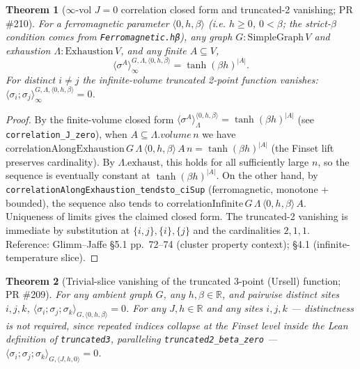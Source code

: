 \documentclass[a4paper,11pt]{article}
\newtheorem{theorem}{Theorem}
\begin{document}
\begin{theorem}[$\infty$-vol $J = 0$ correlation closed form and
truncated-2 vanishing; PR \#210]
For a ferromagnetic parameter $\langle 0, h, \beta \rangle$
(i.e. $h \ge 0$, $0 < \beta$; the strict-$\beta$ condition comes
from \texttt{Ferromagnetic.hβ}), any graph $G :
\mathrm{SimpleGraph}\, V$ and exhaustion $\Lambda :
\mathrm{Exhaustion}\, V$, and any finite $A \subseteq V$,
\[
  \langle \sigma^A \rangle_\infty^{G,\Lambda,\langle 0,h,\beta\rangle}
  = \tanh(\beta h)^{|A|}.
\]
For distinct $i \neq j$ the infinite-volume truncated 2-point
function vanishes:
$\langle \sigma_i; \sigma_j \rangle_\infty^{G,\Lambda,\langle 0,h,\beta\rangle}
= 0$.
\end{theorem}

\begin{proof}
By the finite-volume closed form $\langle \sigma^A
\rangle_\Lambda^{\langle 0,h,\beta\rangle} = \tanh(\beta h)^{|A|}$
(see \texttt{correlation\_J\_zero}), when $A \subseteq \Lambda.volume\,n$
we have
$\text{correlationAlongExhaustion}\,G\,\Lambda\,\langle 0,h,\beta\rangle\,A\,n
= \tanh(\beta h)^{|A|}$
(the Finset lift preserves cardinality). By $\Lambda.\mathrm{exhaust}$,
this holds for all sufficiently large $n$, so the sequence is
eventually constant at $\tanh(\beta h)^{|A|}$. On the other hand,
by \texttt{correlationAlongExhaustion\_tendsto\_ciSup}
(ferromagnetic, monotone + bounded), the sequence also tends to
$\mathrm{correlationInfinite}\,G\,\Lambda\,\langle 0,h,\beta\rangle\,A$.
Uniqueness of limits gives the claimed closed form.
The truncated-2 vanishing is immediate by substitution at
$\{i,j\}, \{i\}, \{j\}$ and the cardinalities $2, 1, 1$.
Reference: Glimm--Jaffe \cite{glimm-jaffe} \S 5.1 pp.~72--74
(cluster property context); \S 4.1 (infinite-temperature slice).
\end{proof}

\begin{theorem}[Trivial-slice vanishing of the truncated 3-point
(Ursell) function; PR \#209]
For any ambient graph $G$, any $h, \beta \in \mathbb{R}$, and
pairwise distinct sites $i, j, k$,
$\langle \sigma_i; \sigma_j; \sigma_k
\rangle_{G,\langle 0,h,\beta\rangle} = 0$.
For any $J, h \in \mathbb{R}$ and any sites $i, j, k$ — distinctness
is not required, since repeated indices collapse at the Finset
level inside the Lean definition of \texttt{truncated3}, paralleling
\texttt{truncated2\_beta\_zero} —
$\langle \sigma_i; \sigma_j; \sigma_k
\rangle_{G,\langle J,h,0\rangle} = 0$.
\end{theorem}
\end{document}
